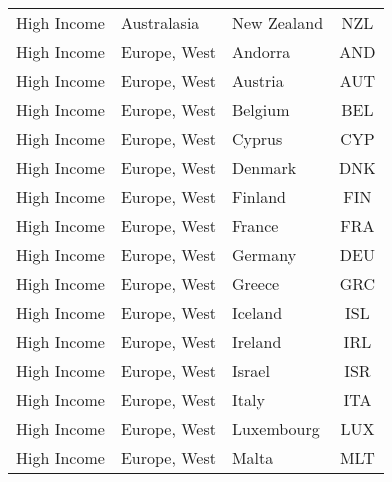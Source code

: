 \begin{longtable}{|p{3cm}|p{3.5cm}|p{5cm}|c|}
                   High Income &                  Australasia &                                       New Zealand &  NZL \\
                   High Income &                 Europe, West &                                           Andorra &  AND \\
                   High Income &                 Europe, West &                                           Austria &  AUT \\
                   High Income &                 Europe, West &                                           Belgium &  BEL \\
                   High Income &                 Europe, West &                                            Cyprus &  CYP \\
                   High Income &                 Europe, West &                                           Denmark &  DNK \\
                   High Income &                 Europe, West &                                           Finland &  FIN \\
                   High Income &                 Europe, West &                                            France &  FRA \\
                   High Income &                 Europe, West &                                           Germany &  DEU \\
                   High Income &                 Europe, West &                                            Greece &  GRC \\
                   High Income &                 Europe, West &                                           Iceland &  ISL \\
                   High Income &                 Europe, West &                                           Ireland &  IRL \\
                   High Income &                 Europe, West &                                            Israel &  ISR \\
                   High Income &                 Europe, West &                                             Italy &  ITA \\
                   High Income &                 Europe, West &                                        Luxembourg &  LUX \\
                   High Income &                 Europe, West &                                             Malta &  MLT \\

\end{longtable}
